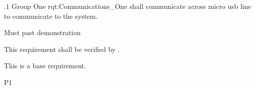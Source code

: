 \ONERQMTV
{\RqtNumberBase.1}
{Group One}
{rqt:Communications_One}
{\ThisSys shall communicate across micro usb line to communicate to the system.}
{
	\item [Phase 1] Must past demonstration
}
{This requirement shall be verified by \TBD.}
{
\item [N/A] This is a base requirement.
}
{
	\item \TBD
}
{P1}

